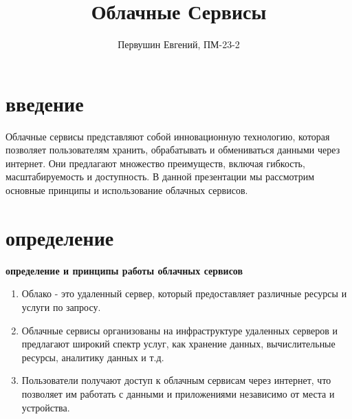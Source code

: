 \documentclass{beamer}
\title{Облачные Сервисы}
\author{Первушин Евгений, ПМ-23-2}
\date{}
\begin{document}
    
    \begin{frame}
        \titlepage
    \end{frame}


    
    \section{введение}
    \begin{frame}
        \Large Облачные сервисы представляют собой инновационную технологию, которая позволяет пользователям хранить, обрабатывать и обмениваться данными через интернет. Они предлагают множество преимуществ, включая гибкость, масштабируемость и доступность. В данной презентации мы рассмотрим основные принципы и использование облачных сервисов.
    \end{frame}


    
    \section{определение}
    \begin{frame}
        \begin{center}
            \textbf{определение и принципы работы облачных сервисов}
        \end{center}
        \vspace{10}
        
        \begin{enumerate}
            \item Облако - это удаленный сервер, который предоставляет различные ресурсы и услуги по запросу.
            \vspace{5}
            \item Облачные сервисы организованы на инфраструктуре удаленных серверов и предлагают широкий спектр услуг, как хранение данных, вычислительные ресурсы, аналитику данных и т.д.
            \vspace{5}
            \item Пользователи получают доступ к облачным сервисам через интернет, что позволяет им работать с данными и приложениями независимо от места и устройства.
        \end{enumerate}
    \end{frame}
    
    
\end{document}
